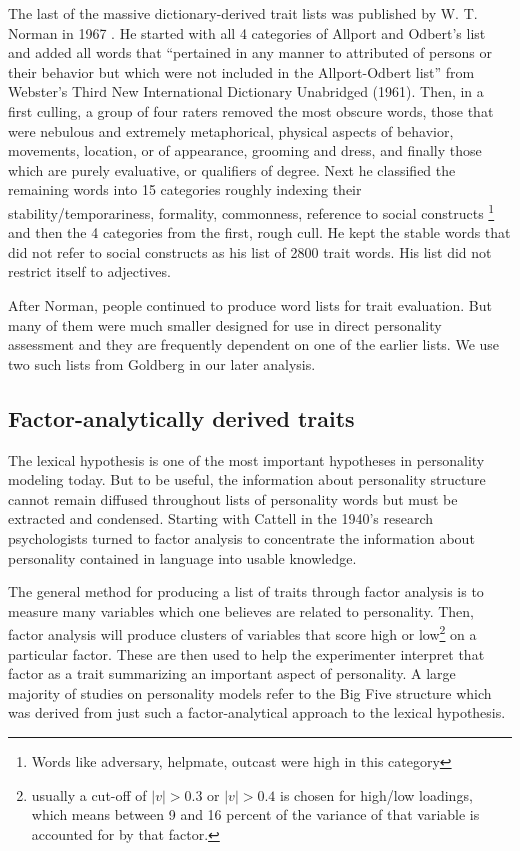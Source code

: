 The last of the massive dictionary-derived trait lists was published by W. T. 
Norman in 1967 . He started with all 4 categories of
Allport and Odbert's list and added all words that ``pertained in any
manner to attributed of persons or their behavior but which were not included 
in the Allport-Odbert list'' from Webster's Third New International Dictionary
Unabridged (1961). Then, in a first culling, a group of four raters removed 
the most obscure words, 
those that were
nebulous and extremely metaphorical, physical aspects of behavior, movements,
location, or of appearance, grooming and dress, and finally those which are
purely evaluative, or qualifiers of degree. Next he
classified the remaining words into 15 categories roughly indexing their
stability/temporariness, formality, commonness, reference to social constructs
\footnote{Words like adversary, helpmate, outcast were high in this category}
and then the 4 categories from the first, rough cull. He kept the stable words
that did not refer to social constructs as his list of 2800 trait words. His
list did not restrict itself to adjectives.

After Norman, people continued to produce word lists for trait evaluation. But
many of them were much smaller \textendash designed for use in direct personality 
assessment and they are frequently dependent on one of the earlier lists. We
use two such lists from Goldberg in our later analysis. 

\subsection{Factor-analytically derived traits}

The lexical hypothesis is one of the most important hypotheses in personality
modeling today. But to be useful, the information about personality structure
cannot remain diffused throughout lists of personality words but must be 
extracted and condensed. Starting with Cattell in the 1940's  research psychologists turned to factor analysis to 
concentrate the information about personality contained in language into usable
knowledge.

The general method for producing a list of traits through factor analysis is to
measure many variables which one believes are related to personality. Then,
factor analysis will produce clusters of variables that score high or 
low\footnote{usually a cut-off of 
$\left|v\right| > 0.3$ or $\left|v\right| > 0.4$
is chosen for high/low loadings, which means between 9 and 16 percent of the
variance of that variable is accounted for by that factor.} on
a particular factor. These are then used to help the experimenter interpret
that factor as a trait summarizing an important aspect of personality. 
A large majority of studies on personality models 
refer to the Big Five structure  which was
derived from just such a factor-analytical approach to the lexical hypothesis.

